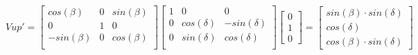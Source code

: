 $$
Vup' =
\begin{bmatrix}
  cos(β) & 0 & sin(β) \\
  0 & 1 & 0 \\
  -sin(β) & 0 & cos(β) \\
\end{bmatrix}
\begin{bmatrix}
  1 & 0 & 0 \\
  0 & cos(δ) & -sin(δ) \\
  0 & sin(δ) & cos(δ) \\
\end{bmatrix}
\begin{bmatrix}
  0 \\
  1 \\
  0
\end{bmatrix}
=
\begin{bmatrix}
  sin(β) \cdot sin(δ) \\
  cos(δ) \\
  cos(β) \cdot sin(δ)
\end{bmatrix}
$$